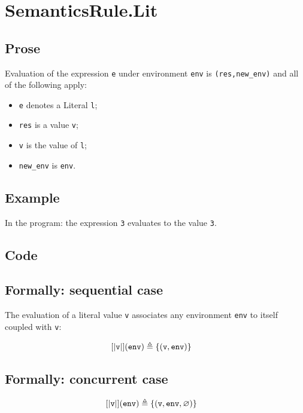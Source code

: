 \documentclass{book}
\begin{document}
\section{SemanticsRule.Lit \label{sec:SemanticsRule.Lit}}

  \subsection{Prose}
  Evaluation of the expression \texttt{e} under environment \texttt{env} is
  \texttt{(res,new\_env)} and all of the following apply:
  \begin{itemize}
  \item \texttt{e} denotes a Literal \texttt{l};
  \item \texttt{res} is a value \texttt{v};
  \item \texttt{v} is the value of \texttt{l};
  \item \texttt{new\_env} is \texttt{env}.
  \end{itemize}

  \subsection{Example}
  In the program:
  the expression \texttt{3} evaluates to the value \texttt{3}.

  \subsection{Code}

\begin{formal}
  \subsection{Formally: sequential case}
  The evaluation of a literal value \texttt{v} associates any environment
\texttt{env} to itself coupled with \texttt{v}:

\begin{align}
  \left[| \texttt{v} \right|](\texttt{env}) & \triangleq \left\{ (\texttt{v}, \texttt{env}) \right\}
  \label{eq:sem-seq-lit}
  \end{align}

  \subsection{Formally: concurrent case}
  \begin{align}
  \left[| \texttt{v} \right|](\texttt{env}) & \triangleq \left\{ (\texttt{v}, \texttt{env}, \varnothing) \right\}
  \label{eq:sem-conc-lit}
  \end{align}
\end{formal}
\end{document}
